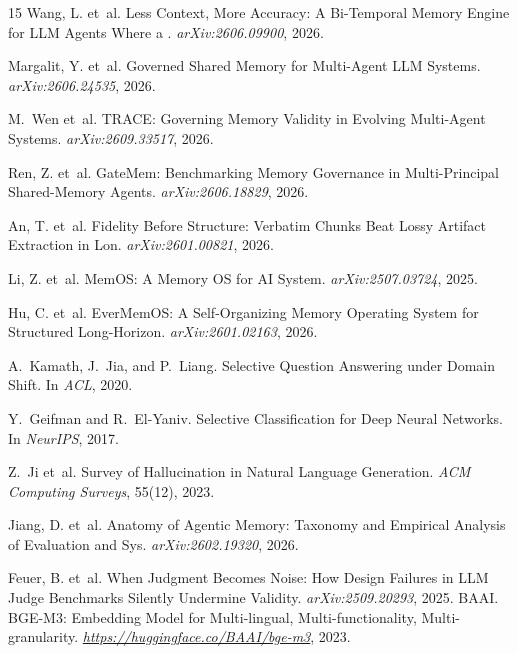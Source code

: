 \documentclass{article}
\begin{document}
\begin{thebibliography}{15}
Wang, L. et~al.
\newblock Less Context, More Accuracy: A Bi-Temporal Memory Engine for LLM Agents Where a . \newblock \emph{arXiv:2606.09900}, 2026.

Margalit, Y. et~al.
\newblock Governed Shared Memory for Multi-Agent LLM Systems. \newblock \emph{arXiv:2606.24535}, 2026.

M.~Wen et~al.
\newblock TRACE: Governing Memory Validity in Evolving Multi-Agent Systems. \newblock \emph{arXiv:2609.33517}, 2026.

Ren, Z. et~al.
\newblock GateMem: Benchmarking Memory Governance in Multi-Principal Shared-Memory Agents. \newblock \emph{arXiv:2606.18829}, 2026.

An, T. et~al.
\newblock Fidelity Before Structure: Verbatim Chunks Beat Lossy Artifact Extraction in Lon. \newblock \emph{arXiv:2601.00821}, 2026.

Li, Z. et~al.
\newblock MemOS: A Memory OS for AI System. \newblock \emph{arXiv:2507.03724}, 2025.

Hu, C. et~al.
\newblock EverMemOS: A Self-Organizing Memory Operating System for Structured Long-Horizon. \newblock \emph{arXiv:2601.02163}, 2026.

A.~Kamath, J.~Jia, and P.~Liang.
\newblock Selective Question Answering under Domain Shift.
\newblock In \emph{ACL}, 2020.

Y.~Geifman and R.~El-Yaniv.
\newblock Selective Classification for Deep Neural Networks.
\newblock In \emph{NeurIPS}, 2017.

Z.~Ji et~al.
\newblock Survey of Hallucination in Natural Language Generation.
\newblock \emph{ACM Computing Surveys}, 55(12), 2023.

Jiang, D. et~al.
\newblock Anatomy of Agentic Memory: Taxonomy and Empirical Analysis of Evaluation and Sys. \newblock \emph{arXiv:2602.19320}, 2026.

Feuer, B. et~al.
\newblock When Judgment Becomes Noise: How Design Failures in LLM Judge Benchmarks Silently Undermine Validity.
\newblock \emph{arXiv:2509.20293}, 2025.
BAAI.
\newblock BGE-M3: Embedding Model for Multi-lingual, Multi-functionality, Multi-granularity.
\newblock \emph{\url{https://huggingface.co/BAAI/bge-m3}}, 2023.

\end{thebibliography}
\end{document}

